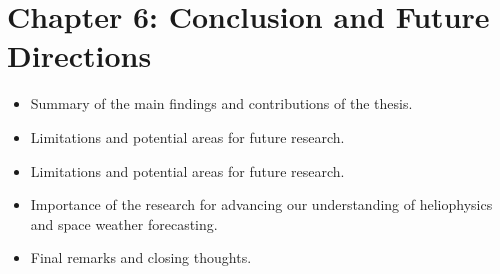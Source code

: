 \documentclass{article}
\begin{document}
\section{Chapter 6: Conclusion and Future Directions}
%

\begin{itemize}
    \item Summary of the main findings and contributions of the thesis.
    \item Limitations and potential areas for future research.
    \item Limitations and potential areas for future research.
    \item Importance of the research for advancing our understanding of heliophysics and space weather forecasting.
    \item Final remarks and closing thoughts.
\end{itemize}




\end{document}
